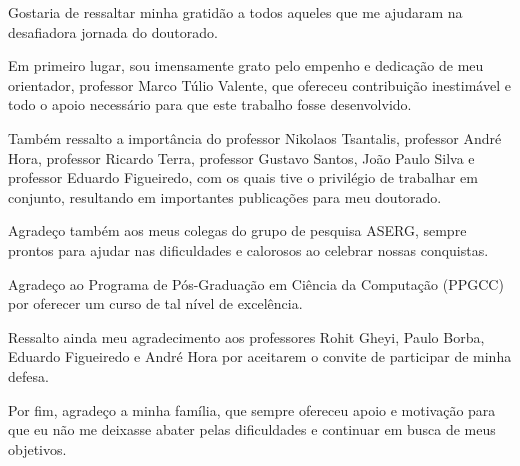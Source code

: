

Gostaria de ressaltar minha gratidão a todos aqueles que me ajudaram na desafiadora jornada do doutorado.

Em primeiro lugar, sou imensamente grato pelo empenho e dedicação de meu orientador, professor Marco Túlio Valente, que ofereceu contribuição inestimável e todo o apoio necessário para que este trabalho fosse desenvolvido.

Também ressalto a importância do professor Nikolaos Tsantalis, professor André Hora, professor Ricardo Terra, professor Gustavo Santos, João Paulo Silva e professor Eduardo Figueiredo, com os quais tive o privilégio de trabalhar em conjunto, resultando em importantes publicações para meu doutorado.

Agradeço também aos meus colegas do grupo de pesquisa ASERG, sempre prontos para ajudar nas dificuldades e calorosos ao celebrar nossas conquistas.

Agradeço ao Programa de Pós-Graduação em Ciência da Computação (PPGCC) por oferecer um curso de tal nível de excelência.

Ressalto ainda meu agradecimento aos professores Rohit Gheyi, Paulo Borba, Eduardo Figueiredo e André Hora por aceitarem o convite de participar de minha defesa.

Por fim, agradeço a minha família, que sempre ofereceu apoio e motivação para que eu não me deixasse abater pelas dificuldades e continuar em busca de meus objetivos.

